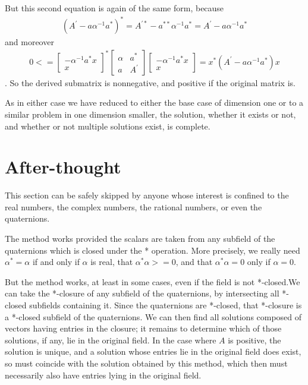 \documentclass{article}
\begin{document}
But this second equation is again of the same form, because
\begin{gather}{}(A^{'} - a\alpha^{-1}a^*)^* = 
A^{'*} - a^{**}\alpha^{-1}a^* = 
A^{'} - a\alpha^{-1}a^* 
\end{gather}
and moreover
\begin{gather}{}
0 <= \begin{bmatrix}-\alpha^{-1}a^*x\\x\end{bmatrix}^*\begin{bmatrix}\alpha & a^* \\ a & A^{'}\end{bmatrix}\begin{bmatrix}-\alpha^{-1}a^*x\\x\end{bmatrix}
= 
x^*(A^{'} - a\alpha^{-1}a^*)x
\end{gather}. So the derived submatrix is nonnegative, and positive if the original matrix is.

As in either case we have reduced to either the base case of dimension one or to a similar problem in one dimension smaller, the solution, whether it exists or
not, and whether or not multiple solutions exist, is complete.

\section{After-thought}
This section can be safely skipped by anyone whose interest is confined to
the real numbers, the complex numbers, the rational numbers, or even the quaternions.

The method works provided the scalars are taken from any subfield of the
quaternions which is closed under the * operation. More precisely, we really
need \begin{math}\alpha^* = \alpha\end{math} if and only if \begin{math}\alpha\end{math} is real, that \begin{math}\alpha^*\alpha >= 0\end{math}, and that 
\begin{math}\alpha^*\alpha = 0\end{math} only if \begin{math}\alpha=0\end{math}.

But the method works, at least in some cases, even if the field is not *-closed.We can take the *-closure of any subfield of the quaternions, by intersecting all *-closed subfields containing it. Since the quaternions are *-closed, that *-closure is a *-closed subfield of the quaternions. We can then find all solutions composed of vectors having entries in the closure; it remains to determine
which of those solutions, if any, lie in the original field. In the case where
\begin{math}A\end{math} is positive, the solution is unique, and a solution whose entries lie in the original field does exist, so must coincide with the solution obtained by this method, which then must necessarily also have entries lying in the original field.
\end{document}
